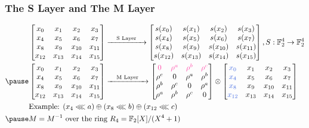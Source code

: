 \documentclass{cubeamer}
\begin{document}
\begin{frame}
\frametitle{The S Layer and The M Layer}
\begin{align*}
    & \begin{bmatrix}
        x_0  & x_1  & x_2  & x_3  \\
        x_4  & x_5  & x_6  & x_7  \\
        x_8  & x_9  & x_{10} & x_{11} \\
        x_{12} & x_{13} & x_{14} & x_{15}
    \end{bmatrix}
    \xrightarrow{\quad \text{S Layer} \quad}
    \begin{bmatrix}
        s(x_0)  & s(x_1)  & s(x_2)  & s(x_3)  \\
        s(x_4)  & s(x_5)  & s(x_6)  & s(x_7)  \\
        s(x_8)  & s(x_9)  & s(x_{10}) & s(x_{11}) \\
        s(x_{12}) & s(x_{13}) & s(x_{14}) & s(x_{15})
    \end{bmatrix}, S: \mathbb{F}_2^4 \to \mathbb{F}_2^4  \\
    \pause
    \vspace{0.5cm}
    & \begin{bmatrix}
        x_0  & x_1  & x_2  & x_3  \\
        x_4  & x_5  & x_6  & x_7  \\
        x_8  & x_9  & x_{10} & x_{11} \\
        x_{12} & x_{13} & x_{14} & x_{15}
    \end{bmatrix}
    \xrightarrow{\quad \text{M Layer} \quad}
    \begin{bmatrix}
    \red {0}      & \red{\rho^a} & \red{\rho^b} & \red{\rho^c} \\
        \rho^c & 0      & \rho^a & \rho^b \\
        \rho^b & \rho^c & 0      & \rho^a \\
        \rho^a & \rho^b & \rho^c & 0
    \end{bmatrix}
    \otimes
    \begin{bmatrix}
        \blue{x_0}  & x_1  & x_2  & x_3  \\
        \blue{x_4}  & x_5  & x_6  & x_7  \\
        \blue{x_8}  & x_9  & x_{10} & x_{11} \\
        \blue{x_{12}} & x_{13} & x_{14} & x_{15}
    \end{bmatrix}
    \\
    &\text{Example: } (x_4 \lll a) \oplus (x_8 \lll b) \oplus (x_{12} \lll c)\\
    \pause
& M = M^{-1} \text{ over the ring } R_4 = \mathbb{F}_2[X]/(X^4 + 1)
\end{align*}

\end{frame}
\end{document}
